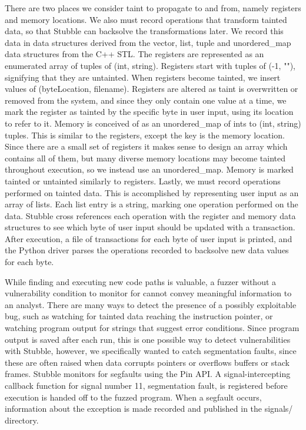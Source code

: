 \documentclass[11pt,expanded,copyright]{fsuthesis}
\begin{document}
There are two places we consider taint to propagate to and from, namely registers and memory locations. We also must record operations that transform tainted data, so that Stubble can backsolve the transformations later. We record this data in data structures derived from the vector, list, tuple and unordered\_map data structures from the C++ STL. The registers are represented as an enumerated array of tuples of (int, string). Registers start with tuples of (-1, ""), signifying that they are untainted. When registers become tainted, we insert values of (byteLocation, filename). Registers are altered as taint is overwritten or removed from the system, and since they only contain one value at a time, we mark the register as tainted by the specific byte in user input, using its location to refer to it. Memory is conceived of as an unordered\_map of ints to (int, string) tuples. This is similar to the registers, except the key is the memory location. Since there are a small set of registers it makes sense to design an array which contains all of them, but many diverse memory locations may become tainted throughout execution, so we instead use an unordered\_map. Memory is marked tainted or untainted similarly to registers. Lastly, we must record operations performed on tainted data. This is accomplished by representing user input as an array of lists. Each list entry is a string, marking one operation performed on the data. Stubble cross references each operation with the register and memory data structures to see which byte of user input should be updated with a transaction. After execution, a file of transactions for each byte of user input is printed, and the Python driver parses the operations recorded to backsolve new data values for each byte.

While finding and executing new code paths is valuable, a fuzzer without a vulnerability condition to monitor for cannot convey meaningful information to an analyst. There are many  ways to detect the presence of a possibly exploitable bug, such as watching for tainted data reaching the instruction pointer, or watching program output for strings that suggest error conditions. Since program output is saved after each run, this is one possible way to detect vulnerabilities with Stubble, however, we specifically wanted to catch segmentation faults, since these are often raised when data corrupts pointers or overflows buffers or stack frames. Stubble monitors for segfaults using the Pin API. A signal-intercepting callback function for signal number 11, segmentation fault, is registered before execution is handed off to the fuzzed program. When a segfault occurs, information about the exception is made recorded and published in the signals/ directory.
\end{document}
